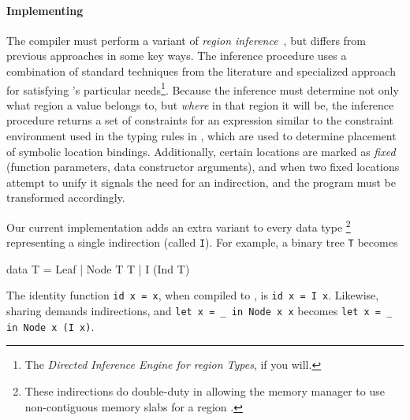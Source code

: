 \documentclass[showabstract,showacknowledgments,showpreface,showdedication]{iuphd}
\theoremstyle{nonumberplain}
\newcommand{\il}[1]{\lstinline[style=inline,mathescape=true];#1;}
\begin{document}
%

\paragraph{Implementing \lamadt}
The compiler must perform a variant of {\em region
  inference}~\cite{regioncalcs,mlkit-retrospective}, but differs from
previous approaches in some key ways.
%
The inference procedure uses a combination of standard techniques from the literature and specialized
approach for satisfying \ourcalc's particular needs\footnote{The {\em
    Directed Inference Engine for region Types}, if you will.}.
%
Because the inference must determine
not only what region a value belongs to, but \emph{where} in that region it will
be, the inference procedure returns a set of constraints for an expression similar to the
constraint environment used in the typing rules in , which are
used to determine placement of symbolic location bindings. Additionally, certain locations
are marked as \emph{fixed} (function parameters, data constructor arguments), and when two
fixed locations attempt to unify it signals the need for an indirection, and the
program must be transformed accordingly.

Our current implementation adds an extra variant to every data type
\footnote{These indirections do double-duty in allowing the memory
  manager to use non-contiguous memory slabs for a region .}
representing a single indirection (called \il{I}).  For example, a binary tree
\il{T} becomes
\begin{code}
data T = Leaf | Node T T | I (Ind T)
\end{code}
%
The identity function \il{id x = x}, when compiled to \ourcalc, is \il{id x = I x}.
Likewise, sharing demands indirections, and 
\il{let x = _ in Node x x}
becomes
\il{let x = _ in Node x (I x)}.
%
%
\end{document}
